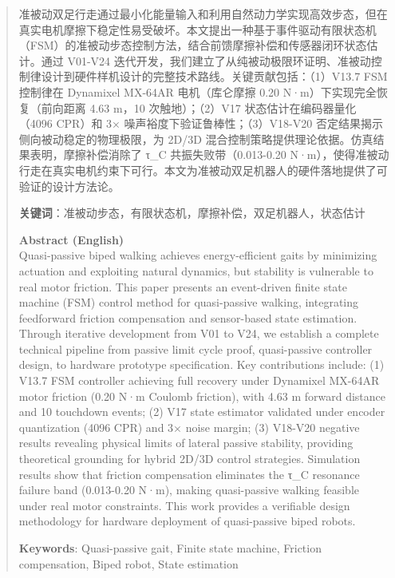 \begin{abstract}
准被动双足行走通过最小化能量输入和利用自然动力学实现高效步态，但在真实电机摩擦下稳定性易受破坏。本文提出一种基于事件驱动有限状态机（FSM）的准被动步态控制方法，结合前馈摩擦补偿和传感器闭环状态估计。通过 V01-V24 迭代开发，我们建立了从纯被动极限环证明、准被动控制律设计到硬件样机设计的完整技术路线。关键贡献包括：（1）V13.7 FSM 控制律在 Dynamixel MX-64AR 电机（库仑摩擦 0.20 N·m）下实现完全恢复（前向距离 4.63 m，10 次触地）；（2）V17 状态估计在编码器量化（4096 CPR）和 3× 噪声裕度下验证鲁棒性；（3）V18-V20 否定结果揭示侧向被动稳定的物理极限，为 2D/3D 混合控制策略提供理论依据。仿真结果表明，摩擦补偿消除了 τ_C 共振失败带（0.013-0.20 N·m），使得准被动行走在真实电机约束下可行。本文为准被动双足机器人的硬件落地提供了可验证的设计方法论。

\textbf{关键词}：准被动步态，有限状态机，摩擦补偿，双足机器人，状态估计

\vspace{0.3cm}

\noindent\textbf{Abstract (English)} \\
Quasi-passive biped walking achieves energy-efficient gaits by minimizing actuation and exploiting natural dynamics, but stability is vulnerable to real motor friction. This paper presents an event-driven finite state machine (FSM) control method for quasi-passive walking, integrating feedforward friction compensation and sensor-based state estimation. Through iterative development from V01 to V24, we establish a complete technical pipeline from passive limit cycle proof, quasi-passive controller design, to hardware prototype specification. Key contributions include: (1) V13.7 FSM controller achieving full recovery under Dynamixel MX-64AR motor friction (0.20 N·m Coulomb friction), with 4.63 m forward distance and 10 touchdown events; (2) V17 state estimator validated under encoder quantization (4096 CPR) and 3× noise margin; (3) V18-V20 negative results revealing physical limits of lateral passive stability, providing theoretical grounding for hybrid 2D/3D control strategies. Simulation results show that friction compensation eliminates the τ_C resonance failure band (0.013-0.20 N·m), making quasi-passive walking feasible under real motor constraints. This work provides a verifiable design methodology for hardware deployment of quasi-passive biped robots.

\textbf{Keywords}: Quasi-passive gait, Finite state machine, Friction compensation, Biped robot, State estimation
\end{abstract}
